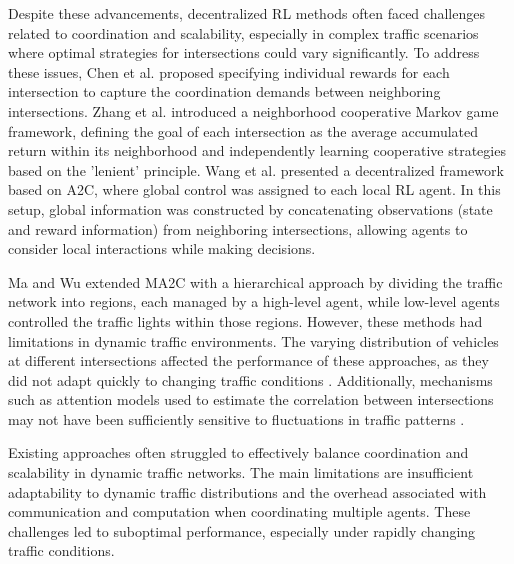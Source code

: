 Despite these advancements, decentralized RL methods often faced challenges related to coordination and scalability, especially in complex traffic scenarios where optimal strategies for intersections could vary significantly. To address these issues, Chen et al. \cite{33} proposed specifying individual rewards for each intersection to capture the coordination demands between neighboring intersections. Zhang et al. \cite{34} introduced a neighborhood cooperative Markov game framework, defining the goal of each intersection as the average accumulated return within its neighborhood and independently learning cooperative strategies based on the 'lenient' principle. Wang et al. \cite{35} presented a decentralized framework based on A2C, where global control was assigned to each local RL agent. In this setup, global information was constructed by concatenating observations (state and reward information) from neighboring intersections, allowing agents to consider local interactions while making decisions.

Ma and Wu \cite{36} extended MA2C with a hierarchical approach by dividing the traffic network into regions, each managed by a high-level agent, while low-level agents controlled the traffic lights within those regions. However, these methods had limitations in dynamic traffic environments. The varying distribution of vehicles at different intersections affected the performance of these approaches, as they did not adapt quickly to changing traffic conditions \cite{new8}. Additionally, mechanisms such as attention models used to estimate the correlation between intersections may not have been sufficiently sensitive to fluctuations in traffic patterns \cite{new9}.

Existing approaches often struggled to effectively balance coordination and scalability in dynamic traffic networks. The main limitations are insufficient adaptability to dynamic traffic distributions and the overhead associated with communication and computation when coordinating multiple agents. These challenges led to suboptimal performance, especially under rapidly changing traffic conditions.